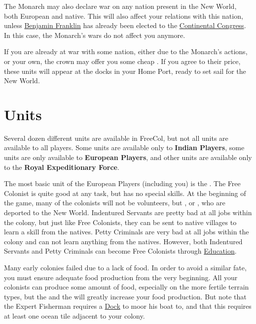 \documentclass[12pt]{article}
\begin{document}
The Monarch may also declare war on any nation present in the New
World, both European and native. This will also affect your relations
with this nation, unless \hyperlink{Benjamin Franklin}{Benjamin
Franklin} has already been elected to the \hyperlink{Continental
Congress}{Continental Congress}. In this case, the Monarch's wars do
not affect you anymore.

If you are already at war with some nation, either due to the
Monarch's actions, or your own, the crown may offer you some cheap
. If you agree to their price, these units will
appear at the docks in your Home Port, ready to set sail for the New
World.



\hypertarget{Units}{\section{Units}}

Several dozen different units are available in FreeCol, but not all
units are available to all players. Some units are available only to
\textbf{Indian Players}, some units are only available to
\textbf{European Players}, and other units are available only to the
\textbf{Royal Expeditionary Force}.

The most basic unit of the European Players (including you) is the
. The Free Colonist is quite good at any task, but
has no special skills. At the beginning of the game, many of the
colonists will not be volunteers, but , or
, who are deported to the New World. Indentured
Servants are pretty bad at all jobs within the colony, but just like
Free Colonists, they can be sent to native villages to learn a skill
from the natives. Petty Criminals are very bad at all jobs within the
colony and can not learn anything from the natives. However, both
Indentured Servants and Petty Criminals can become Free Colonists
through \hyperlink{Skills and Education}{Education}.

Many early colonies failed due to a lack of food. In order to avoid a
similar fate, you must ensure adequate food production from the very
beginning. All your colonists can produce some amount of food,
especially on the more fertile terrain types, but the  and the  will greatly increase your
food production. But note that the Expert Fisherman requires a
\hyperlink{Dock}{Dock} to moor his boat to, and that this requires at
least one ocean tile adjacent to your colony.
\end{document}
